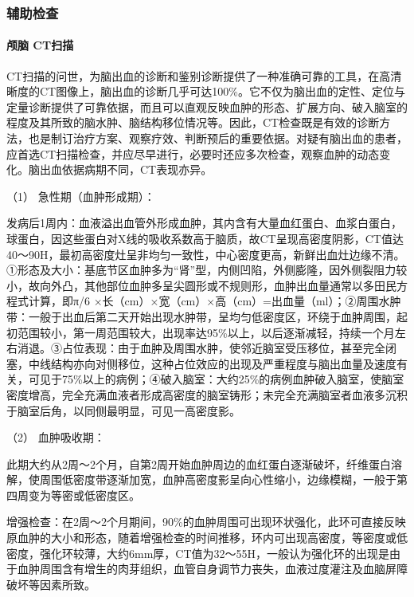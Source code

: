 \subsubsection{辅助检查}

\paragraph{颅脑 CT扫描}

CT扫描的问世，为脑出血的诊断和鉴别诊断提供了一种准确可靠的工具，在高清晰度的CT图像上，脑出血的诊断几乎可达100\%。它不仅为脑出血的定性、定位与定量诊断提供了可靠依据，而且可以直观反映血肿的形态、扩展方向、破入脑室的程度及其所致的脑水肿、脑结构移位情况等。因此，CT检查既是有效的诊断方法，也是制订治疗方案、观察疗效、判断预后的重要依据。对疑有脑出血的患者，应首选CT扫描检查，并应尽早进行，必要时还应多次检查，观察血肿的动态变化。脑出血依据病期不同，CT表现亦异。

\hypertarget{text00243.htmlux5cux23CHP8-1-3-2-2-1-1}{}
（1） 急性期（血肿形成期）：

发病后1周内：血液溢出血管外形成血肿，其内含有大量血红蛋白、血浆白蛋白，球蛋白，因这些蛋白对X线的吸收系数高于脑质，故CT呈现高密度阴影，CT值达40～90H，最初高密度灶呈非均匀一致性，中心密度更高，新鲜出血灶边缘不清。①形态及大小：基底节区血肿多为“肾”型，内侧凹陷，外侧膨隆，因外侧裂阻力较小，故向外凸，其他部位血肿多呈尖圆形或不规则形，血肿出血量通常以多田民方程式计算，即π/6
×长（cm）×宽（cm）×高（cm）=出血量（ml）；②周围水肿带：一般于出血后第二天开始出现水肿带，呈均匀低密度区，环绕于血肿周围，起初范围较小，第一周范围较大，出现率达95\%以上，以后逐渐减轻，持续一个月左右消退。③占位表现：由于血肿及周围水肿，使邻近脑室受压移位，甚至完全闭塞，中线结构亦向对侧移位，这种占位效应的出现及严重程度与脑出血量及速度有关，可见于75\%以上的病例；④破入脑室：大约25\%的病例血肿破入脑室，使脑室密度增高，完全充满血液者形成高密度的脑室铸形；未完全充满脑室者血液多沉积于脑室后角，以同侧最明显，可见一高密度影。

\hypertarget{text00243.htmlux5cux23CHP8-1-3-2-2-1-2}{}
（2） 血肿吸收期：

此期大约从2周～2个月，自第2周开始血肿周边的血红蛋白逐渐破坏，纤维蛋白溶解，使周围低密度带逐渐加宽，血肿高密度影呈向心性缩小，边缘模糊，一般于第四周变为等密或低密度区。

增强检查：在2周～2个月期间，90\%的血肿周围可出现环状强化，此环可直接反映原血肿的大小和形态，随着增强检查的时间推移，环内可出现高密度，等密度或低密度，强化环较薄，大约6mm厚，CT值为32～55H，一般认为强化环的出现是由于血肿周围含有增生的肉芽组织，血管自身调节力丧失，血液过度灌注及血脑屏障破坏等因素所致。

